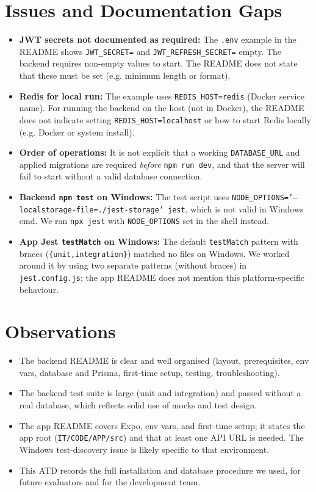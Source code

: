 \section{Issues and Documentation Gaps}
\label{sec:problems_encountered}
\begin{itemize}
    \item \textbf{JWT secrets not documented as required:} The \texttt{.env} example in the README shows \texttt{JWT\_SECRET=} and \texttt{JWT\_REFRESH\_SECRET=} empty. The backend requires non-empty values to start. The README does not state that these must be set (e.g. minimum length or format).
    \item \textbf{Redis for local run:} The example uses \texttt{REDIS\_HOST=redis} (Docker service name). For running the backend on the host (not in Docker), the README does not indicate setting \texttt{REDIS\_HOST=localhost} or how to start Redis locally (e.g. Docker or system install).
    \item \textbf{Order of operations:} It is not explicit that a working \texttt{DATABASE\_URL} and applied migrations are required \emph{before} \texttt{npm run dev}, and that the server will fail to start without a valid database connection.
    \item \textbf{Backend \texttt{npm test} on Windows:} The test script uses \texttt{NODE\_OPTIONS='--localstorage-file=./jest-storage'}\ \texttt{jest}, which is not valid in Windows cmd. We ran \texttt{npx jest} with \texttt{NODE\_OPTIONS} set in the shell instead.
    \item \textbf{App Jest \texttt{testMatch} on Windows:} The default \texttt{testMatch} pattern with braces (\texttt{\{unit,integration\}}) matched no files on Windows. We worked around it by using two separate patterns (without braces) in \texttt{jest.config.js}; the app README does not mention this platform-specific behaviour.
\end{itemize}

\section{Observations}
\label{sec:observations}
\begin{itemize}
    \item The backend README is clear and well organised (layout, prerequisites, env vars, database and Prisma, first-time setup, testing, troubleshooting).
    \item The backend test suite is large (unit and integration) and passed without a real database, which reflects solid use of mocks and test design.
    \item The app README covers Expo, env vars, and first-time setup; it states the app root (\texttt{IT/CODE/APP/src}) and that at least one API URL is needed. The Windows test-discovery issue is likely specific to that environment.
    \item This ATD records the full installation and database procedure we used, for future evaluators and for the development team.
\end{itemize}
